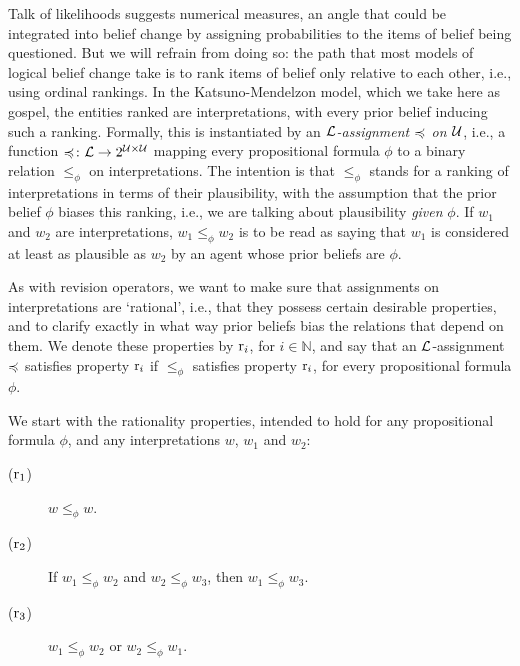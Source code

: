 Talk of likelihoods suggests numerical measures, an angle that could be integrated
into belief change by assigning probabilities to the items of belief being questioned.
But we will refrain from doing so: 
the path that most models of logical belief change take is to 
rank items of belief only relative to each other,
i.e., using ordinal rankings.
In the Katsuno-Mendelzon model, which we take here as gospel,
the entities ranked are interpretations, with every prior belief 
inducing such a ranking.
Formally, this is instantiated by an 
\emph{$\mathcal{L}$-assignment $\preccurlyeq$ on $\mathcal{U}$},
i.e., a function $\preccurlyeq\colon\mathcal{L}\rightarrow 2^{\mathcal{U}\times\mathcal{U}}$ 
mapping every propositional formula $\phi$ 
to a binary relation $\le_\phi$ on interpretations.
The intention is that $\le_\phi$ stands for 
a ranking of interpretations in terms of their plausibility, 
with the assumption that the prior belief $\phi$ biases this ranking, 
i.e., we are talking about plausibility \emph{given} $\phi$.
If $w_1$ and $w_2$ are interpretations,
$w_1\le_\phi w_2$ is to be read as saying that 
$w_1$ is considered at least as plausible as $w_2$ by an agent 
whose prior beliefs are $\phi$.

As with revision operators, we want to make sure that 
assignments on interpretations are `rational',
i.e., that they possess certain desirable properties,
and to clarify exactly in what way prior beliefs 
bias the relations that depend on them.
We denote these properties by $\mathrm{r}_{i}$, for $i\in\mathbb{N}$,
and say that an $\mathcal{L}$-assignment $\preccurlyeq$ satisfies property $\mathrm{r}_{i}$ 
if $\le_{\phi}$ satisfies property $\mathrm{r}_{i}$,
for every propositional formula $\phi$.

We start with the rationality properties,
intended to hold for any propositional formula $\phi$,
and any interpretations $w$, $w_1$ and $w_2$:

\begin{description}
	\item[($\mathrm{r}_{1}$)] $w\le_\phi w$.
	\item[($\mathrm{r}_{2}$)] If $w_1\le_\phi w_2$ and $w_2\le_\phi w_3$, then $w_1\le_\phi w_3$.
 	\item[($\mathrm{r}_{3}$)] $w_1\le_\phi w_2$ or $w_2\le_\phi w_1$.
\end{description}


